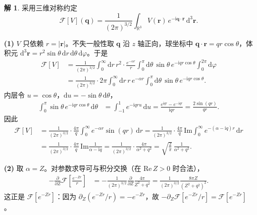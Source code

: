 \documentclass[11pt]{article}
\theoremstyle{remark}
\theoremstyle{definition}
\newtheorem{solution}{解}
\begin{document}
\begin{solution}
采用三维对称约定
\begin{equation}
\mathcal{F}[V](\mathbf{q})
=\frac{1}{(2\pi)^{3/2}}
\int_{\mathbb{R}^3}
V(\mathbf{r})\,e^{-\mathrm{i}\mathbf{q}\cdot\mathbf{r}}\,\mathrm{d}^3\mathbf{r}.
\label{eq:hw6-ft3}
\end{equation}

\medskip
\noindent\textbf{(1)}
$V$ 只依赖 $r=|\mathbf{r}|$。不失一般性取 $\mathbf{q}$ 沿 $z$ 轴正向，球坐标中
$\mathbf{q}\cdot\mathbf{r}=qr\cos\theta$，体积元
$\mathrm{d}^3\mathbf{r}=r^2\sin\theta\,\mathrm{d}r\,\mathrm{d}\theta\,\mathrm{d}\varphi$。于是
\begin{align*}
\mathcal{F}[V]
&=\frac{1}{(2\pi)^{3/2}}
\int_0^{\infty}\mathrm{d}r\,r^2\cdot\frac{e^{-\alpha r}}{r}
\int_0^{\pi}\mathrm{d}\theta\,\sin\theta\,e^{-\mathrm{i}qr\cos\theta}
\int_0^{2\pi}\mathrm{d}\varphi\\
&=\frac{1}{(2\pi)^{3/2}}\cdot 2\pi
\int_0^{\infty}\mathrm{d}r\,r\,e^{-\alpha r}
\int_0^{\pi}\mathrm{d}\theta\,\sin\theta\,e^{-\mathrm{i}qr\cos\theta}.
\end{align*}
内层令 $u=\cos\theta$，$\mathrm{d}u=-\sin\theta\,\mathrm{d}\theta$，
\begin{align*}
\int_0^{\pi}\sin\theta\,e^{-\mathrm{i}qr\cos\theta}\,\mathrm{d}\theta
&=\int_{-1}^{1}e^{-\mathrm{i}qr u}\,\mathrm{d}u
=\frac{e^{\mathrm{i}qr}-e^{-\mathrm{i}qr}}{\mathrm{i}qr}
=\frac{2\sin(qr)}{qr}.
\end{align*}
因此
\begin{align*}
\mathcal{F}[V]
&=\frac{1}{(2\pi)^{3/2}}\cdot\frac{4\pi}{q}
\int_0^{\infty}e^{-\alpha r}\sin(qr)\,\mathrm{d}r
=\frac{1}{(2\pi)^{3/2}}\cdot\frac{4\pi}{q}
\,\mathrm{Im}
\int_0^{\infty}e^{-(\alpha-\mathrm{i}q)r}\,\mathrm{d}r\\
&=\frac{1}{(2\pi)^{3/2}}\cdot\frac{4\pi}{q}
\,\mathrm{Im}\frac{1}{\alpha-\mathrm{i}q}
=\frac{1}{(2\pi)^{3/2}}\cdot\frac{4\pi}{\alpha^2+q^2}
=\sqrt{\frac{2}{\pi}}\,\frac{1}{\alpha^2+q^2}.
\end{align*}

\medskip
\noindent\textbf{(2)}
取 $\alpha=Z$。对参数求导可与积分交换（在 $\mathrm{Re}\,Z>0$ 时合法），
\begin{align*}
-\frac{\partial}{\partial Z}
\mathcal{F}\!\left[\frac{e^{-Zr}}{r}\right]
&=-\frac{1}{(2\pi)^{3/2}}
\frac{\partial}{\partial Z}
\frac{4\pi}{Z^2+q^2}
=\frac{1}{(2\pi)^{3/2}}
\frac{8\pi Z}{(Z^2+q^2)^2}.
\end{align*}
这正是 $\mathcal{F}[e^{-Zr}]$：因为
$\partial_Z(e^{-Zr}/r)=-e^{-Zr}$，故
$-\partial_Z\mathcal{F}[e^{-Zr}/r]=\mathcal{F}[e^{-Zr}]$。


\end{solution}
\end{document}
